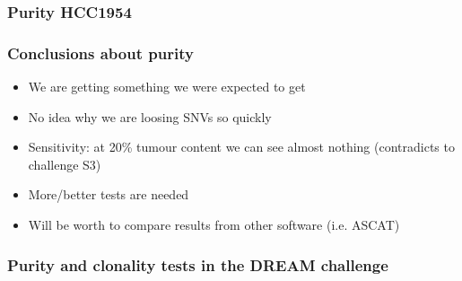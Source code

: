 \documentclass{beamer}
\begin{document}
\begin{frame}
\frametitle{Purity HCC1954}
\end{frame}

\begin{frame}
\frametitle{Conclusions about purity}
    \begin{itemize}
        \item We are getting something we were expected to get
        \item No idea why we are loosing SNVs so quickly
        \item Sensitivity: at 20\% tumour content we can see almost nothing (contradicts to challenge S3)
        \item More/better tests are needed
        \item Will be worth to compare results from other software (i.e. ASCAT) 
    \end{itemize}
\end{frame}

\begin{frame}
\frametitle{Purity and clonality tests in the DREAM challenge}
\end{frame}
\end{document}
